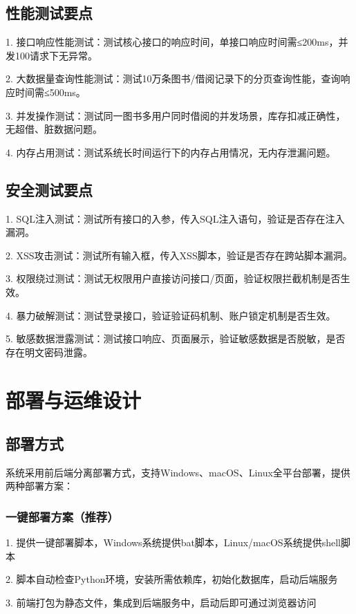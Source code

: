 \documentclass[12pt, a4paper]{article}
\begin{document}
\subsection{性能测试要点}

1. 接口响应性能测试：测试核心接口的响应时间，单接口响应时间需≤200ms，并发100请求下无异常。

2. 大数据量查询性能测试：测试10万条图书/借阅记录下的分页查询性能，查询响应时间需≤500ms。

3. 并发操作测试：测试同一图书多用户同时借阅的并发场景，库存扣减正确性，无超借、脏数据问题。

4. 内存占用测试：测试系统长时间运行下的内存占用情况，无内存泄漏问题。

\subsection{安全测试要点}

1. SQL注入测试：测试所有接口的入参，传入SQL注入语句，验证是否存在注入漏洞。

2. XSS攻击测试：测试所有输入框，传入XSS脚本，验证是否存在跨站脚本漏洞。

3. 权限绕过测试：测试无权限用户直接访问接口/页面，验证权限拦截机制是否生效。

4. 暴力破解测试：测试登录接口，验证验证码机制、账户锁定机制是否生效。

5. 敏感数据泄露测试：测试接口响应、页面展示，验证敏感数据是否脱敏，是否存在明文密码泄露。

\newpage
\section{部署与运维设计}

\subsection{部署方式}

系统采用前后端分离部署方式，支持Windows、macOS、Linux全平台部署，提供两种部署方案：

\subsubsection{一键部署方案（推荐）}

1. 提供一键部署脚本，Windows系统提供bat脚本，Linux/macOS系统提供shell脚本

2. 脚本自动检查Python环境，安装所需依赖库，初始化数据库，启动后端服务

3. 前端打包为静态文件，集成到后端服务中，启动后即可通过浏览器访问
\end{document}
